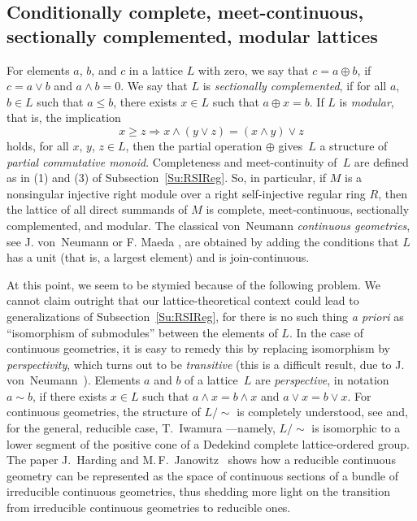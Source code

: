 \documentclass[psamsfonts,reqno]{memo-l}
\theoremstyle{plain}
\theoremstyle{definition}
\theoremstyle{remark}
\numberwithin{equation}{section}
\newcommand{\pcm}{partial commutative mon\-oid}
\begin{document}
\subsection{Conditionally complete, meet-continuous, sectionally complemented,
modular lattices}\label{Su:CMSMLatt}
For elements $a$, $b$, and $c$ in a lattice $L$ with zero, we say that
$c=a\oplus b$,
if $c=a\vee b$ and $a\wedge b=0$. We say that $L$
is \emph{sectionally complemented}, if for all $a$, $b\in L$ such that
$a\leq b$, there exists $x\in L$ such that $a\oplus x=b$. If $L$ is
\emph{modular}, that is, the implication
   \[
   x\geq z\Longrightarrow x\wedge(y\vee z)=(x\wedge y)\vee z
   \]
holds, for all $x$, $y$, $z\in L$, then the partial
operation $\oplus$ gives~$L$ a structure of
\emph{\pcm}. Completeness and
meet-continuity of~$L$ are defined as in (1) and (3) of
Subsection~\ref{Su:RSIReg}. So, in particular, if $M$ is a nonsingular
injective right module over a right self-injective regular ring
%
$R$, then the lattice of all direct summands of $M$ is complete,
meet-continuous, sectionally complemented, and modular. The classical
von~Neumann
\emph{continuous geometries}, see J. von~Neumann
\cite{JvNbook} or F. Maeda
\cite{FMae55}, are obtained by adding the conditions that
$L$ has a unit (that is, a largest element) and is join-continuous.

At this point, we seem to be stymied because of the following problem. We
cannot claim outright that our lattice-theoretical context could lead to
generalizations of Subsection~\ref{Su:RSIReg}, for there is no such
thing \emph{a priori} as ``isomorphism of submodules'' between the elements of
$L$. In the case of continuous geometries, it is
easy to remedy this by replacing isomorphism by
\emph{perspectivity}, which
turns out to be
\emph{transitive} (this is a difficult result, due to J.
von~Neumann~\cite{JvNbook}). Elements $a$ and $b$ of
a lattice~$L$ are
\emph{perspective}, in notation 
$a\sim b$, if there exists
$x\in L$ such that $a\wedge x=b\wedge x$ and $a\vee x=b\vee x$.
For continuous geometries, the structure of
$L/{\sim}$ is completely understood, see \cite{JvNbook}
 and, for the general, reducible case,
T.~Iwamura \cite{Iwam44}---namely,
$L/{\sim}$ is isomorphic to a lower segment of the positive cone of a
Dedekind complete lattice-ordered group. The paper J.~Harding and
M.\,F.~Janowitz~\cite{HaJa97}
%
shows how a reducible continuous
geometry can be represented as the space of continuous sections of a bundle
of irreducible continuous geometries, thus shedding more light on the
transition from irreducible continuous geometries
to reducible ones.
\end{document}
